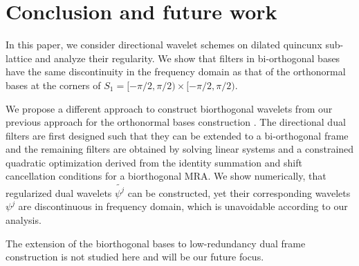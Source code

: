 \section{Conclusion and future work}\label{sec: end}
In this paper, we consider directional wavelet schemes on dilated quincunx sub-lattice and analyze their regularity. We show that filters in bi-orthogonal bases have the same discontinuity in the frequency domain as that of the orthonormal bases at the corners of $S_1 = [-\pi/2,\pi/2)\times[-\pi/2,\pi/2)$. 

 We propose a different approach to construct biorthogonal wavelets from our previous approach for the orthonormal bases construction \cite{yin2014orthshear}. The directional dual filters are first designed such that they can be extended to a bi-orthogonal frame and the remaining filters are obtained by solving linear systems and a constrained quadratic optimization derived from the identity summation and shift cancellation conditions for a biorthogonal MRA. We show numerically, that regularized dual wavelets $\widetilde{\psi^j}$ can be constructed, yet their corresponding wavelets $\psi^j$ are discontinuous in frequency domain, which is unavoidable according to our analysis.

The extension of the biorthogonal bases to low-redundancy dual frame construction is not studied here and will be our future focus.